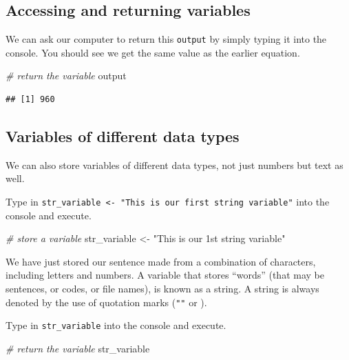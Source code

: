 \documentclass[
]{book}
\newenvironment{Shaded}{\begin{snugshade}}{\end{snugshade}}
\newcommand{\CommentTok}[1]{\textcolor[rgb]{0.56,0.35,0.01}{\textit{#1}}}
\newcommand{\NormalTok}[1]{#1}
\newcommand{\OtherTok}[1]{\textcolor[rgb]{0.56,0.35,0.01}{#1}}
\newcommand{\StringTok}[1]{\textcolor[rgb]{0.31,0.60,0.02}{#1}}
\begin{document}
\hypertarget{accessing-and-returning-variables}{%
\subsection{Accessing and returning variables}\label{accessing-and-returning-variables}}

We can ask our computer to return this \texttt{output} by simply typing it into the console. You should see we get the same value as the earlier equation.

\begin{Shaded}
\begin{Highlighting}[]
\CommentTok{\# return the variable}
\NormalTok{output}
\end{Highlighting}
\end{Shaded}

\begin{verbatim}
## [1] 960
\end{verbatim}

\hypertarget{variables-of-different-data-types}{%
\subsection{Variables of different data types}\label{variables-of-different-data-types}}

We can also store variables of different data types, not just numbers but text as well.

Type in \texttt{str\_variable\ \textless{}-\ "This\ is\ our\ first\ string\ variable"} into the console and execute.

\begin{Shaded}
\begin{Highlighting}[]
\CommentTok{\# store a variable}
\NormalTok{str\_variable }\OtherTok{\textless{}{-}} \StringTok{"This is our 1st string variable"}
\end{Highlighting}
\end{Shaded}

We have just stored our sentence made from a combination of characters, including letters and numbers. A variable that stores ``words'' (that may be sentences, or codes, or file names), is known as a string. A string is always denoted by the use of quotation marks (\texttt{""} or \texttt{\textquotesingle{}\textquotesingle{}}).

Type in \texttt{str\_variable} into the console and execute.

\begin{Shaded}
\begin{Highlighting}[]
\CommentTok{\# return the variable}
\NormalTok{str\_variable}
\end{Highlighting}
\end{Shaded}
\end{document}

